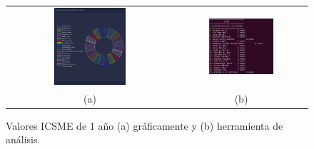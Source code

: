 \documentclass[a4paper, 12pt]{book}
\begin{document}
\begin{figure}[!h]
    \centering
    \begin{tabular}{cc}
    \includegraphics[width=0.45\textwidth]{img/icsme_1_year_graph.png} &  
    \includegraphics[width=0.52\textwidth]{img/icsme_1_year.png} \\ 
    (a) &(b) 
    \end{tabular}
    \caption{Valores ICSME de 1 año (a) gráficamente y (b) herramienta de análisis.}
    \label{fig:comp_icsme_1_year}
\end{figure}
\end{document}
